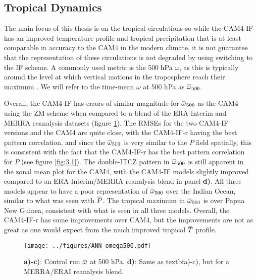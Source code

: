 \documentclass[letterpaper,12pt,titlepage,oneside,final]{book}
\newcommand{\overbar}[1]{\mkern 1.5mu\overline{\mkern-1.5mu#1\mkern-1.5mu}\mkern 1.5mu}
\begin{document}
\subsection{Tropical Dynamics}
The main focus of this thesis is on the tropical circulations so while the CAM4-IF has an improved temperature profile and tropical precipitation that is at least comparable in accuracy to the CAM4 in the modern climate, it is not guarantee that the representation of these circulations is not degraded by using switching to the IF scheme. A commonly used metric is the 500 hPa $\omega$, as this is typically around the level at which vertical motions in the troposphere reach their maximum \citep{vecchi_global_2007}. We will refer to the time-mean $\omega$ at 500 hPa as $\overbar{\omega}_{500}$.

Overall, the CAM4-IF has errors of similar magnitude for $\overbar{\omega}_{500}$ as the CAM4 using the ZM scheme when compared to a blend of the ERA-Interim and MERRA reanalysis datasets (figure \ref{fig:omega}). The RMSEs for the two CAM4-IF versions and the CAM4 are quite close, with the CAM4-IF-r having the best pattern correlation, and since the $\overbar{\omega}_{500}$ is very similar to the $P$ field spatially, this is consistent with the fact that the CAM4-IF-r has the best pattern correlation for $P$ (see figure \ref{fig:3.1}). The double-ITCZ pattern in $\overbar{\omega}_{500}$ is still apparent in the zonal mean plot for the CAM4, with the CAM4-IF models slightly improved compared to an ERA-Interim/MERRA reanalysis blend in panel \textbf{d)}. All three models appear to have a poor representation of $\overbar{\omega}_{500}$ over the Indian Ocean, similar to what was seen with $\overbar{P}$. The tropical maximum in $\overbar{\omega}_{500}$ is over Papua New Guinea, consistent with what is seen in all three models. Overall, the CAM4-IF-r has some improvements over CAM4, but the improvements are not as great as one would expect from the much improved tropical $\overbar{T}$ profile.
\begin{figure}[H]
\centering
\noindent\texttt{[image: ../figures/ANN\_omega500.pdf]}\hfill
\caption{\textbf{a)-c)}: Control run $\overbar{\omega}$ at 500 hPa. \textbf{d)}: Same as textbf{a)-c)}, but for a MERRA/ERAI reanalysis blend.}
\label{fig:omega}
\end{figure}
\end{document}
